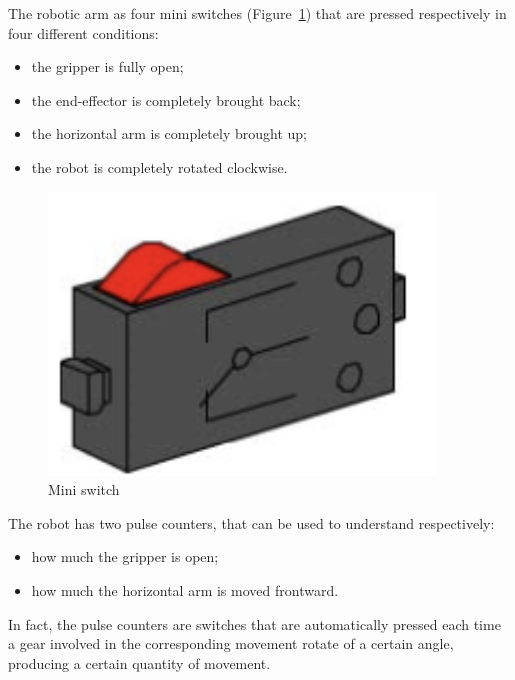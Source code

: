 \documentclass[a4paper,11pt]{report}
\theoremstyle{definition}
\theoremstyle{plain}
\begin{document}
            \bigskip
            The robotic arm as four mini switches (Figure~\ref{switch}) that are pressed respectively in four different conditions:
            \begin{itemize}
                \item the gripper is fully open;
                \item the end-effector is completely brought back;
                \item the horizontal arm is completely brought up;
                \item the robot is completely rotated clockwise.
            \end{itemize}
            \begin{figure}[H] %
                \includegraphics[scale=0.38]{images/switch.png}
                \centering
                \caption{Mini switch}
                \label{switch}
            \end{figure}

            \bigskip
            The robot has two pulse counters, that can be used to understand respectively:
            \begin{itemize} 
                \item how much the gripper is open;
                \item how much the horizontal arm is moved frontward.
            \end{itemize}
            In fact, the pulse counters are switches that are automatically pressed each time a gear involved in the corresponding movement rotate of a certain angle, producing a certain quantity of movement.
\end{document}

